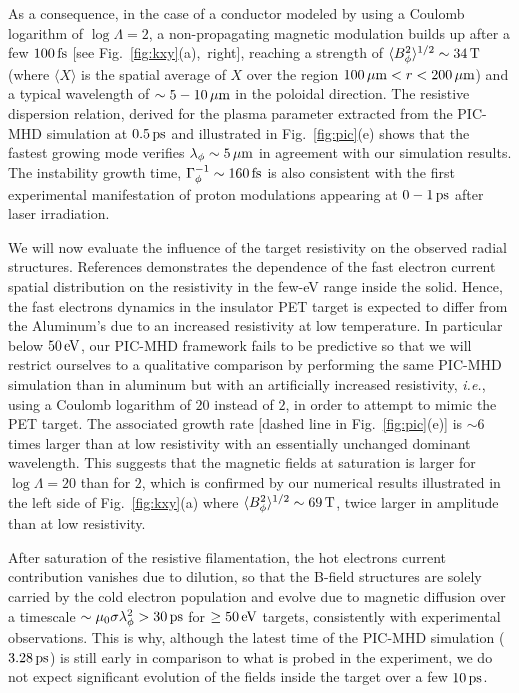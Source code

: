 \documentclass[aps,twocolumn,showpacs,superscriptaddress]{revtex4}
\begin{document}
%
As a consequence, in the case of a conductor modeled by using a Coulomb logarithm of $\log \Lambda = 2$,  a non-propagating magnetic modulation builds up after a few $100\,\rm fs$ [see \mbox{Fig.~\ref{fig:kxy}(a), right}], reaching a strength of  $\langle B_\phi^2\rangle^{1/2}\sim 34\,\rm T$ (where $\langle X \rangle$ is the spatial average of $X$ over the region  $100\,\mu\mathrm{m}<r<200\,\mu \rm m$) and a typical wavelength of $\sim 5-10\,\rm \mu m$  in the poloidal direction. The resistive dispersion relation, derived for the plasma parameter extracted from the PIC-MHD simulation at $0.5\,\rm ps$ and illustrated in Fig.~\ref{fig:pic}(e)  shows that the fastest growing mode verifies $\lambda_\phi \sim 5\,\mu \rm m$  in agreement with our simulation results. The instability  growth time, $\Gamma_\phi^{-1} \sim 160\,\rm fs$  is also  consistent with the first experimental manifestation of proton modulations appearing at $0-1\,\rm ps$ after laser irradiation.

We will now evaluate the influence of the target resistivity on the observed radial structures.
References \cite{PRL_McKenna_2011, PRL_MacLellan_2013} demonstrates the dependence of the fast electron current spatial distribution  on the resistivity in the few-eV range inside the solid. Hence, the fast electrons dynamics in the insulator PET target is expected to differ from the Aluminum's due to an increased resistivity at low temperature. In particular below $50\,\rm eV$, our PIC-MHD framework fails to be predictive so that we will restrict ourselves to a qualitative comparison by performing the same PIC-MHD simulation than in aluminum but with an artificially  increased resistivity, \emph{i.e.}, using  a Coulomb logarithm of $20$ instead of $2$, in order to attempt to mimic the PET target. The associated growth rate [dashed line in Fig.~\ref{fig:pic}(e)] is $\sim 6$ times larger than at low resistivity with  an  essentially unchanged dominant wavelength. This suggests \cite{POF_Davidson_1972} that the magnetic fields at saturation is larger for $\log\Lambda = 20$ than for $2$, which is confirmed by our numerical results illustrated in  the left side of Fig.~\ref{fig:kxy}(a) where  $\langle B_\phi^2 \rangle^{1/2} \sim 69\,\rm T$, twice larger  in amplitude than at low resistivity.

After saturation of  the resistive filamentation, the hot electrons current contribution vanishes due to dilution, so that the B-field structures are solely carried by the cold electron population and evolve due to magnetic diffusion  over a  timescale $\sim \mu_0 \sigma \lambda_\phi^2 > 30\,\rm ps$ for $ \ge 50\,\rm eV$ targets, consistently with experimental observations. This is why, although the latest time of the PIC-MHD simulation ($3.28\,\rm ps$) is still early in comparison to what is probed in the experiment,  we do not expect significant evolution of the fields inside the target over a few $10\,\rm ps$.
\end{document}

